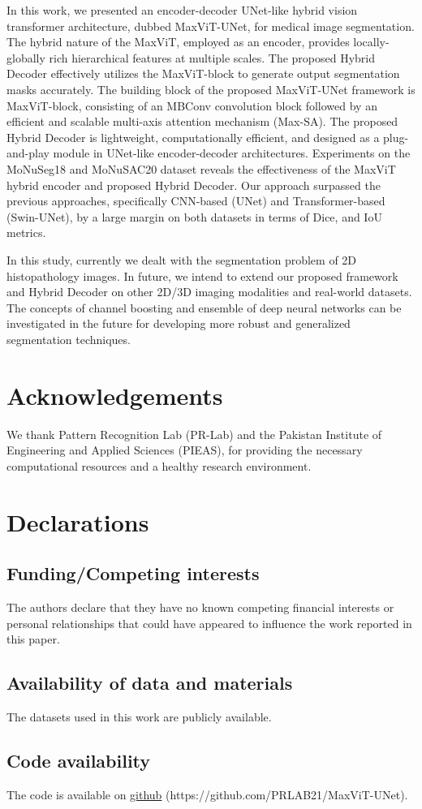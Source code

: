 \documentclass{article}
\begin{document}
In this work, we presented an encoder-decoder UNet-like hybrid vision transformer architecture, dubbed MaxViT-UNet, for medical image segmentation. The hybrid nature of the MaxViT, employed as an encoder, provides locally-globally rich hierarchical features at multiple scales. The proposed Hybrid Decoder effectively utilizes the MaxViT-block to generate output segmentation masks accurately. The building block of the proposed MaxViT-UNet framework is MaxViT-block, consisting of an MBConv convolution block followed by an efficient and scalable multi-axis attention mechanism (Max-SA). The proposed Hybrid Decoder is lightweight, computationally efficient, and designed as a plug-and-play module in UNet-like encoder-decoder architectures. Experiments on the MoNuSeg18 and MoNuSAC20 dataset reveals the effectiveness of the MaxViT hybrid encoder and proposed Hybrid Decoder. Our approach surpassed the previous approaches, specifically CNN-based (UNet) and Transformer-based (Swin-UNet), by a large margin on both datasets in terms of Dice, and IoU metrics.

In this study, currently we dealt with the segmentation problem of 2D histopathology images. In future, we intend to extend our proposed framework and Hybrid Decoder on other 2D/3D imaging modalities and real-world datasets. The concepts of channel boosting and ensemble of deep neural networks can be investigated in the future for developing more robust and generalized segmentation techniques.

\section*{Acknowledgements}

We thank Pattern Recognition Lab (PR-Lab) and the Pakistan Institute of Engineering and Applied Sciences (PIEAS), for providing the necessary computational resources and a healthy research environment.

\section*{Declarations}

\subsection*{Funding/Competing interests}
The authors declare that they have no known competing financial interests or personal relationships that could have appeared to influence the work reported in this paper.

\subsection*{Availability of data and materials}
The datasets used in this work are publicly available.

\subsection*{Code availability}
The code is available on \href{https://github.com/PRLAB21/MaxViT-UNet}{github} (https://github.com/PRLAB21/MaxViT-UNet).

  
  
\end{document}
